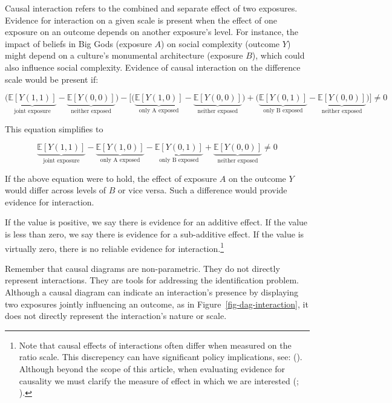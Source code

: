 \documentclass[
  singlecolumn,
  9pt]{article}
\begin{document}
Causal interaction refers to the combined and separate effect of two
exposures. Evidence for interaction on a given scale is present when the
effect of one exposure on an outcome depends on another exposure's
level. For instance, the impact of beliefs in Big Gods (exposure \(A\))
on social complexity (outcome \(Y\)) might depend on a culture's
monumental architecture (exposure \(B\)), which could also influence
social complexity. Evidence of causal interaction on the difference
scale would be present if:

\[\bigg(\underbrace{\mathbb{E}[Y(1,1)]}_{\text{joint exposure}} - \underbrace{\mathbb{E}[Y(0,0)]}_{\text{neither exposed}}\bigg) - \bigg[ \bigg(\underbrace{\mathbb{E}[Y(1,0)]}_{\text{only A exposed}} - \underbrace{\mathbb{E}[Y(0,0)]}_{\text{neither exposed}}\bigg) + \bigg(\underbrace{\mathbb{E}[Y(0,1)]}_{\text{only B exposed}} - \underbrace{\mathbb{E}[Y(0,0)]}_{\text{neither exposed}} \bigg)\bigg] \neq 0 \]

This equation simplifies to

\[ \underbrace{\mathbb{E}[Y(1,1)]}_{\text{joint exposure}} - \underbrace{\mathbb{E}[Y(1,0)]}_{\text{only A exposed}} - \underbrace{\mathbb{E}[Y(0,1)]}_{\text{only B exposed}} + \underbrace{\mathbb{E}[Y(0,0)]}_{\text{neither exposed}} \neq 0 \]

If the above equation were to hold, the effect of exposure \(A\) on the
outcome \(Y\) would differ across levels of \(B\) or vice versa. Such a
difference would provide evidence for interaction.

If the value is positive, we say there is evidence for an additive
effect. If the value is less than zero, we say there is evidence for a
sub-additive effect. If the value is virtually zero, there is no
reliable evidence for interaction.\footnote{Note that causal effects of
  interactions often differ when measured on the ratio scale. This
  discrepency can have significant policy implications, see:
  (). Although
  beyond the scope of this article, when evaluating evidence for
  causality we must clarify the measure of effect in which we are
  interested (;
  ).}

Remember that causal diagrams are non-parametric. They do not directly
represent interactions. They are tools for addressing the identification
problem. Although a causal diagram can indicate an interaction's
presence by displaying two exposures jointly influencing an outcome, as
in Figure~\ref{fig-dag-interaction}, it does not directly represent the
interaction's nature or scale.
\end{document}
